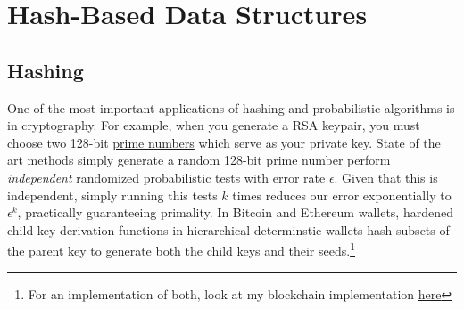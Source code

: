 \section{Hash-Based Data Structures} 

\subsection{Hashing}

  One of the most important applications of hashing and probabilistic algorithms is in cryptography. For example, when you generate a RSA keypair, you must choose two 128-bit \hyperref[nt-def:prime-number]{prime numbers} which serve as your private key. State of the art methods simply generate a random 128-bit prime number perform \textit{independent} randomized probabilistic tests with error rate $\epsilon$. Given that this is independent, simply running this tests $k$ times reduces our error exponentially to $\epsilon^k$, practically guaranteeing primality. In Bitcoin and Ethereum wallets, hardened child key derivation functions in hierarchical determinstic wallets hash subsets of the parent key to generate both the child keys and their seeds.\footnote{For an implementation of both, look at my blockchain implementation \href{https://github.com/mbahng/blade/blob/main/backend/src/crypt/primes.js\#L61}{here}} 

